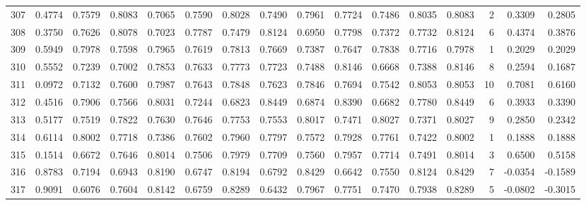 \begin{tabular}{lrrrrrrrrrrrrrrr}
307 &      0.4774 &  0.7579 &  0.8083 &  0.7065 &  0.7590 &  0.8028 &  0.7490 &  0.7961 &  0.7724 &  0.7486 &   0.8035 &     0.8083 &      2 &                    0.3309 &                     0.2805 \\
308 &      0.3750 &  0.7626 &  0.8078 &  0.7023 &  0.7787 &  0.7479 &  0.8124 &  0.6950 &  0.7798 &  0.7372 &   0.7732 &     0.8124 &      6 &                    0.4374 &                     0.3876 \\
309 &      0.5949 &  0.7978 &  0.7598 &  0.7965 &  0.7619 &  0.7813 &  0.7669 &  0.7387 &  0.7647 &  0.7838 &   0.7716 &     0.7978 &      1 &                    0.2029 &                     0.2029 \\
310 &      0.5552 &  0.7239 &  0.7002 &  0.7853 &  0.7633 &  0.7773 &  0.7723 &  0.7488 &  0.8146 &  0.6668 &   0.7388 &     0.8146 &      8 &                    0.2594 &                     0.1687 \\
311 &      0.0972 &  0.7132 &  0.7600 &  0.7987 &  0.7643 &  0.7848 &  0.7623 &  0.7846 &  0.7694 &  0.7542 &   0.8053 &     0.8053 &     10 &                    0.7081 &                     0.6160 \\
312 &      0.4516 &  0.7906 &  0.7566 &  0.8031 &  0.7244 &  0.6823 &  0.8449 &  0.6874 &  0.8390 &  0.6682 &   0.7780 &     0.8449 &      6 &                    0.3933 &                     0.3390 \\
313 &      0.5177 &  0.7519 &  0.7822 &  0.7630 &  0.7646 &  0.7753 &  0.7553 &  0.8017 &  0.7471 &  0.8027 &   0.7371 &     0.8027 &      9 &                    0.2850 &                     0.2342 \\
314 &      0.6114 &  0.8002 &  0.7718 &  0.7386 &  0.7602 &  0.7960 &  0.7797 &  0.7572 &  0.7928 &  0.7761 &   0.7422 &     0.8002 &      1 &                    0.1888 &                     0.1888 \\
315 &      0.1514 &  0.6672 &  0.7646 &  0.8014 &  0.7506 &  0.7979 &  0.7709 &  0.7560 &  0.7957 &  0.7714 &   0.7491 &     0.8014 &      3 &                    0.6500 &                     0.5158 \\
316 &      0.8783 &  0.7194 &  0.6943 &  0.8190 &  0.6747 &  0.8194 &  0.6792 &  0.8429 &  0.6642 &  0.7550 &   0.8124 &     0.8429 &      7 &                   -0.0354 &                    -0.1589 \\
317 &      0.9091 &  0.6076 &  0.7604 &  0.8142 &  0.6759 &  0.8289 &  0.6432 &  0.7967 &  0.7751 &  0.7470 &   0.7938 &     0.8289 &      5 &                   -0.0802 &                    -0.3015 \\

\end{tabular}
